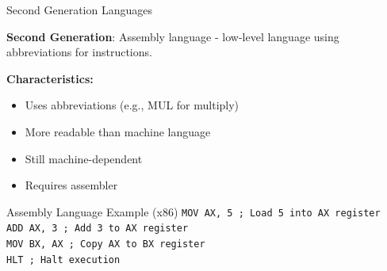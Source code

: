 \documentclass[aspectratio=169]{beamer}
\begin{document}
\begin{frame}{Second Generation Languages}
    \begin{definition}
        \textbf{Second Generation}: Assembly language - low-level language using abbreviations for instructions.
    \end{definition}
    
    \vspace{0.3cm}
    \textbf{Characteristics:}
    \begin{itemize}
        \item Uses abbreviations (e.g., MUL for multiply)
        \item More readable than machine language
        \item Still machine-dependent
        \item Requires assembler
    \end{itemize}
    

     \begin{exampleblock}{Assembly Language Example (x86)}
        \texttt{MOV AX, 5\hspace{1cm} ; Load 5 into AX register}\\
        \texttt{ADD AX, 3\hspace{1cm} ; Add 3 to AX register}\\
        \texttt{MOV BX, AX\hspace{0.9cm} ; Copy AX to BX register}\\
        \texttt{HLT\hspace{1.7cm} ; Halt execution}
    \end{exampleblock}
    
\end{frame}
\end{document}
